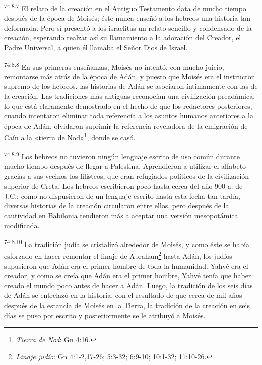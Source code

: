 \par
\textsuperscript{74:8.7} El relato de la creación en el Antiguo Testamento data de mucho tiempo después de la época de Moisés; éste nunca enseñó a los hebreos una historia tan deformada. Pero sí presentó a los israelitas un relato sencillo y condensado de la creación, esperando realzar así su llamamiento a la adoración del Creador, el Padre Universal, a quien él llamaba el Señor Dios de Israel.

\par
\textsuperscript{74:8.8} En sus primeras enseñanzas, Moisés no intentó, con mucho juicio, remontarse más atrás de la época de Adán, y puesto que Moisés era el instructor supremo de los hebreos, las historias de Adán se asociaron íntimamente con las de la creación. Las tradiciones más antiguas reconocían una civilización preadámica, lo que está claramente demostrado en el hecho de que los redactores posteriores, cuando intentaron eliminar toda referencia a los asuntos humanos anteriores a la época de Adán, olvidaron suprimir la referencia reveladora de la emigración de Caín a la «tierra de Nod»\footnote{\textit{Tierra de Nod}: Gn 4:16.}, donde se casó.

\par
\textsuperscript{74:8.9} Los hebreos no tuvieron ningún lenguaje escrito de uso común durante mucho tiempo después de llegar a Palestina. Aprendieron a utilizar el alfabeto gracias a sus vecinos los filisteos, que eran refugiados políticos de la civilización superior de Creta. Los hebreos escribieron poco hasta cerca del año 900 a. de J.C.; como no dispusieron de un lenguaje escrito hasta esta fecha tan tardía, diversas historias de la creación circularon entre ellos, pero después de la cautividad en Babilonia tendieron más a aceptar una versión mesopotámica modificada.

\par
\textsuperscript{74:8.10} La tradición judía se cristalizó alrededor de Moisés, y como éste se había esforzado en hacer remontar el linaje de Abraham\footnote{\textit{Linaje judío}: Gn 4:1-2,17-26; 5:3-32; 6:9-10; 10:1-32; 11:10-26.} hasta Adán, los judíos supusieron que Adán era el primer hombre de toda la humanidad. Yahvé era el creador, y como se creía que Adán era el primer hombre, Yahvé tenía que haber creado el mundo poco antes de hacer a Adán. Luego, la tradición de los seis días de Adán se entrelazó en la historia, con el resultado de que cerca de mil años después de la estancia de Moisés en la Tierra, la tradición de la creación en seis días se puso por escrito y posteriormente se le atribuyó a Moisés.

